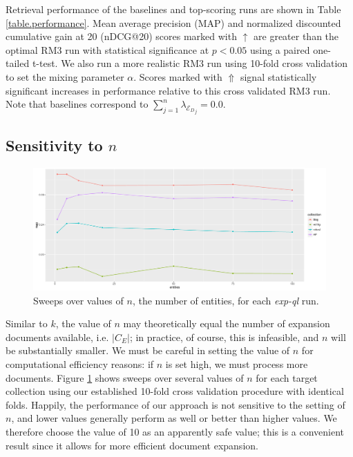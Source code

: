 \documentclass{article}
\begin{document}
Retrieval performance of the baselines and top-scoring runs are shown in Table \ref{table.performance}. Mean average precision (MAP) and normalized discounted cumulative gain at 20 (nDCG@20) scores marked with $\uparrow$ are greater than the optimal RM3 run with statistical significance at $p < 0.05$ using a paired one-tailed t-test. We also run a more realistic RM3 run using 10-fold cross validation to set the mixing parameter $\alpha$. Scores marked with $\Uparrow$ signal statistically significant increases in performance relative to this cross validated RM3 run. Note that baselines correspond to $\sum_{j=1}^n \lambda_{{\mathcal{E}_D}_j} = 0.0$. 

\subsection{Sensitivity to $n$}\label{section.n-sensitivity}

\begin{figure}[!htb]
\centering
\includegraphics[width=\columnwidth]{figures/n-sweep.pdf}
\caption{Sweeps over values of $n$, the number of entities, for each \textit{exp-ql} run.}
\label{figure.n-sweeps}
\end{figure}

Similar to $k$, the value of $n$ may theoretically equal the number of expansion documents available, i.e. $|C_E|$; in practice, of course, this is infeasible, and $n$ will be substantially smaller. We must be careful in setting the value of $n$ for computational efficiency reasons: if $n$ is set high, we must process more documents. Figure \ref{figure.n-sweeps} shows sweeps over several values of $n$ for each target collection using our established 10-fold cross validation procedure with identical folds. Happily, the performance of our approach is not sensitive to the setting of $n$, and lower values generally perform as well or better than higher values. We therefore choose the value of 10 as an apparently safe value; this is a convenient result since it allows for more efficient document expansion.
\end{document}
